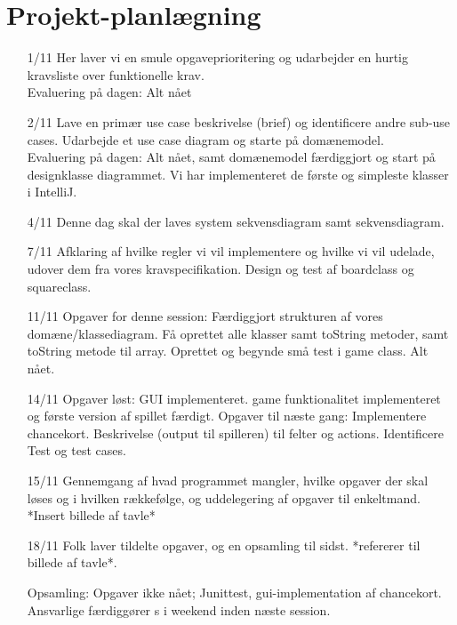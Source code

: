 \documentclass{article}
\begin{document}
\section{Projekt-planlægning}
\begin{itemize}
    \item [1/11] Her laver vi en smule opgaveprioritering og udarbejder en hurtig kravsliste over funktionelle krav.\\
    Evaluering på dagen: Alt nået
    \item [2/11] Lave en primær use case beskrivelse (brief) og identificere andre sub-use cases. Udarbejde et use case diagram og starte på domænemodel.\\
    Evaluering på dagen: Alt nået, samt domænemodel færdiggjort og start på designklasse diagrammet. Vi har implementeret de første og simpleste klasser i IntelliJ.
    \item [4/11] Denne dag skal der laves system sekvensdiagram samt sekvensdiagram.
    \item [7/11]
    Afklaring af hvilke regler vi vil implementere og hvilke vi vil udelade, udover dem fra vores kravspecifikation. Design og test af boardclass og squareclass.
    \item [11/11]
    Opgaver for denne session:
    Færdiggjort strukturen af vores domæne/klassediagram. Få oprettet alle klasser samt toString metoder, samt toString metode til array. Oprettet og begynde små test i game class. Alt nået.
    
    \item [14/11]
    Opgaver løst: GUI implementeret. game funktionalitet implementeret og  første version af spillet færdigt. 
    Opgaver til næste gang: Implementere chancekort. Beskrivelse (output til spilleren) til felter og actions. Identificere Test og test cases.
    
    \item[15/11]
            Gennemgang af hvad programmet mangler, hvilke opgaver der skal løses og i hvilken rækkefølge,  og uddelegering af opgaver til enkeltmand.
            *Insert billede af tavle*
            
    \item[18/11]
            Folk laver tildelte opgaver, og en opsamling til sidst. 
            *refererer til billede af tavle*.
           
            Opsamling: Opgaver ikke nået; Junittest, gui-implementation af chancekort. Ansvarlige færdiggører s i weekend inden næste session.
                      

\end{itemize}
\end{document}
